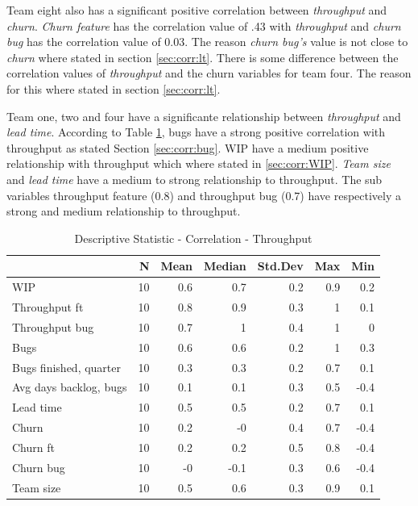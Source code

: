 \documentclass[UKenglish]{ifimaster}  %
\begin{document}
 
Team eight also has a significant positive correlation between \textit{throughput} and \textit{churn}. \textit{Churn feature} has the correlation value of .43 with \textit{throughput} and \textit{churn bug} has the correlation value of 0.03. The reason \textit{churn bug's} value is not close to \textit{churn} where stated in section \ref{sec:corr:lt}. There is some difference between the correlation values of \textit{throughput} and the churn variables for team four. The reason for this where stated in section \ref{sec:corr:lt}. 

Team one, two and four have a significante relationship between \textit{throughput} and \textit{lead time}. According to Table \ref{DS:corr:TP}, bugs have a strong positive correlation with throughput as stated Section \ref{sec:corr:bug}. WIP have a medium positive relationship with throughput which where stated in \ref{sec:corr:WIP}. \textit{Team size} and \textit{lead time} have a medium to strong relationship to throughput. The sub variables throughput feature (0.8) and throughput bug (0.7) have respectively a strong and medium relationship to throughput. 

\begin{table}[!htbp]
 \centering
 \begin{tabular}{ | l | r | r | r | r | r | r | }
 \hline
& \bf{N} & \bf{Mean} & \bf{Median} & \bf{Std.Dev} & \bf{Max} & \bf{Min} \\ \hline
WIP  & 10 & 0.6 & 0.7 & 0.2 & 0.9 & 0.2\\ \hline
Throughput ft  & 10 & 0.8 & 0.9 & 0.3 & 1 & 0.1\\ \hline
Throughput bug  & 10 & 0.7 & 1 & 0.4 & 1 & 0\\ \hline
Bugs  & 10 & 0.6 & 0.6 & 0.2 & 1 & 0.3\\ \hline
Bugs finished, quarter  & 10 & 0.3 & 0.3 & 0.2 & 0.7 & 0.1\\ \hline
Avg days backlog, bugs  & 10 & 0.1 & 0.1 & 0.3 & 0.5 & -0.4\\ \hline
Lead time & 10 & 0.5 & 0.5 & 0.2 & 0.7 & 0.1\\ \hline
Churn  & 10 & 0.2 & -0 & 0.4 & 0.7 & -0.4\\ \hline
Churn ft  & 10 & 0.2 & 0.2 & 0.5 & 0.8 & -0.4\\ \hline
Churn bug  & 10 & -0 & -0.1 & 0.3 & 0.6 & -0.4\\ \hline
Team size  & 10 & 0.5 & 0.6 & 0.3 & 0.9 & 0.1\\ \hline
\end{tabular}
 \caption{Descriptive Statistic - Correlation - Throughput}
 \label{DS:corr:TP}
 \end{table}
\end{document}
